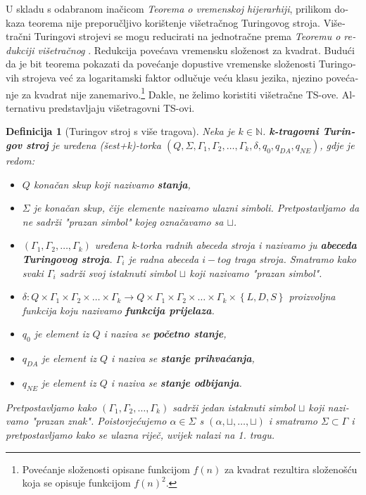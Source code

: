 \documentclass[12pt]{rectors}
\newtheorem{definition}{Definicija}[section]
\begin{document}
\begin{otherlanguage}{croatian}
U skladu s odabranom inačicom \textit{Teorema o vremenskoj hijerarhiji},
prilikom dokaza teorema nije preporučljivo korištenje višetračnog Turingovog stroja.
Višetračni Turingovi strojevi se mogu reducirati na jednotračne prema \textit{Teoremu o redukciji višetračnog} \cite{vukovic2016}. Redukcija povećava vremensku složenost za kvadrat.
Budući da je bit teorema pokazati da povećanje dopustive vremenske složenosti Turingovih strojeva već za logaritamski faktor odlučuje veću klasu jezika, njezino povećanje za kvadrat nije zanemarivo.\footnote{Povećanje složenosti opisane funkcijom $f(n)$ za kvadrat rezultira složenošću koja se opisuje funkcijom $f(n)^2$.}
Dakle, ne želimo koristiti višetračne TS-ove. Alternativu predstavljaju višetragovni TS-ovi. 
\begin{definition}[Turingov stroj s više tragova]
Neka je $k\in \mathbb{N}$.
\textbf{k-tragovni Turingov stroj} je uređena (šest+k)-torka $\left ( Q,\Sigma , \Gamma_1, \Gamma_2, \hdots, \Gamma_k ,\delta, q_0, q_{DA} , q_{NE}\right )$, gdje je redom:
\begin{itemize}
    \item $Q$ konačan skup koji nazivamo \textbf{stanja},
    \item $\Sigma$ je konačan skup, čije elemente nazivamo ulazni simboli. Pretpostavljamo da ne sadrži "prazan simbol" kojeg označavamo sa $\sqcup$.
    \item $\left ( \Gamma_1, \Gamma_2, \hdots, \Gamma_k \right )$  uređena k-torka radnih abeceda stroja i nazivamo ju \textbf{abeceda Turingovog stroja}. 
    $\Gamma_i$ je radna abeceda $i-tog$ traga stroja.
    Smatramo kako svaki $\Gamma_i$ sadrži svoj istaknuti simbol $\sqcup$ koji nazivamo "prazan simbol".
    \item $\delta : Q \times \Gamma_1 \times \Gamma_2 \times \hdots \times \Gamma_k \to Q \times \Gamma_1 \times \Gamma_2 \times \hdots \times \Gamma_k \times \left \{ L,D,S \right\} $ proizvoljna funkcija koju nazivamo \textbf{funkcija prijelaza}.
\item $q_0$ je element iz $Q$ i naziva se \textbf{početno stanje},
\item $q_{DA}$ je element iz $Q$ i naziva se \textbf{stanje prihvaćanja},
\item $q_{NE}$ je element iz $Q$ i naziva se \textbf{stanje odbijanja}.
\end{itemize}


Pretpostavljamo kako  $\left ( \Gamma_1, \Gamma_2, \hdots, \Gamma_k \right ) $ sadrži jedan istaknuti simbol $\sqcup$ koji nazivamo "prazan znak".
Poistovjećujemo $\alpha \in \Sigma$ s $\left ( \alpha, \sqcup, \hdots, \sqcup \right )$ i smatramo $\Sigma \subset \Gamma$ i pretpostavljamo kako se ulazna riječ, uvijek nalazi na 1. tragu.
\end{definition}


\end{otherlanguage}
\end{document}
